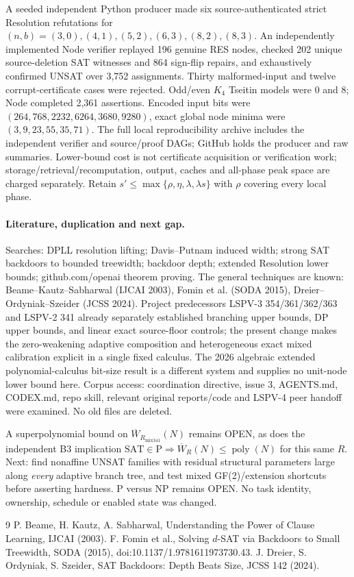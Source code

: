 \documentclass[11pt]{article}
\begin{document}
A seeded independent Python producer made six source-authenticated strict Resolution refutations for $(n,b)=(3,0),(4,1),(5,2),(6,3),(8,2),(8,3)$. An independently implemented Node verifier replayed 196 genuine RES nodes, checked 202 unique source-deletion SAT witnesses and 864 sign-flip repairs, and exhaustively confirmed UNSAT over 3,752 assignments. Thirty malformed-input and twelve corrupt-certificate cases were rejected. Odd/even $K_4$ Tseitin models were 0 and 8; Node completed 2,361 assertions. Encoded input bits were $(264,768,2232,6264,3680,9280)$, exact global node minima were $(3,9,23,55,35,71)$. The full local reproducibility archive includes the independent verifier and source/proof DAGs; GitHub holds the producer and raw summaries. Lower-bound cost is not certificate acquisition or verification work; storage/retrieval/recomputation, output, caches and all-phase peak space are charged separately. Retain $s'\le\max\{\rho,\eta,\lambda,\lambda s\}$ with $\rho$ covering every local phase.

\paragraph{Literature, duplication and next gap.}
Searches: DPLL resolution lifting; Davis--Putnam induced width; strong SAT backdoors to bounded treewidth; backdoor depth; extended Resolution lower bounds; github.com/openai theorem proving. The general techniques are known: Beame--Kautz--Sabharwal (IJCAI 2003), Fomin et al. (SODA 2015), Dreier--Ordyniak--Szeider (JCSS 2024). Project predecessors LSPV-3 354/361/362/363 and LSPV-2 341 already separately established branching upper bounds, DP upper bounds, and linear exact source-floor controls; the present change makes the zero-weakening adaptive composition and heterogeneous exact mixed calibration explicit in a single fixed calculus. The 2026 algebraic extended polynomial-calculus bit-size result is a different system and supplies no unit-node lower bound here. Corpus access: coordination directive, issue 3, AGENTS.md, CODEX.md, repo skill, relevant original reports/code and LSPV-4 peer handoff were examined. No old files are deleted.

A superpolynomial bound on $\overline W_{R_{\mathrm{mix341}}}(N)$ remains OPEN, as does the independent B3 implication $\mathrm{SAT}\in\mathrm P\Rightarrow \overline W_R(N)\le\operatorname{poly}(N)$ for this same $R$. Next: find nonaffine UNSAT families with residual structural parameters large along \emph{every} adaptive branch tree, and test mixed GF(2)/extension shortcuts before asserting hardness. P versus NP remains OPEN. No task identity, ownership, schedule or enabled state was changed.
\begin{thebibliography}{9}
 P. Beame, H. Kautz, A. Sabharwal, Understanding the Power of Clause Learning, IJCAI (2003).
 F. Fomin et al., Solving $d$-SAT via Backdoors to Small Treewidth, SODA (2015), doi:10.1137/1.9781611973730.43.
 J. Dreier, S. Ordyniak, S. Szeider, SAT Backdoors: Depth Beats Size, JCSS 142 (2024).
\end{thebibliography}
\end{document}
